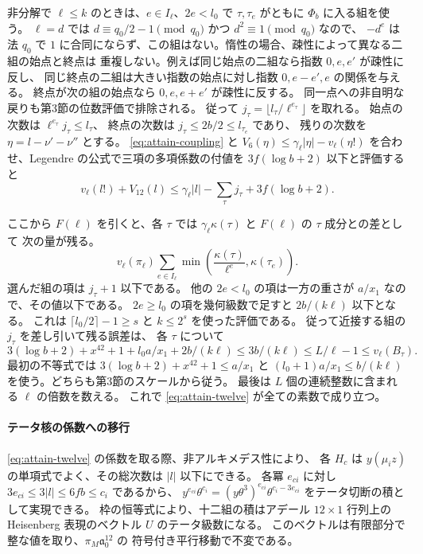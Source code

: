 非分解で \(\ell\le k\) のときは、\(e\in I_\ell\)、\(2e<l_0\) で
\(\tau,\tau_e\) がともに \(\Phi_b\) に入る組を使う。
\(\ell=d\) では \(d\equiv q_0/2-1\pmod{q_0}\) かつ \(d^2\equiv1\pmod{q_0}\) なので、
\(-d^e\) は法 \(q_0\) で \(1\) に合同にならず、この組はない。惰性の場合、疎性によって異なる二組の始点と終点は
重複しない。例えば同じ始点の二組なら指数 \(0,e,e'\) が疎性に反し、
同じ終点の二組は大きい指数の始点に対し指数 \(0,e-e',e\) の関係を与える。
終点が次の組の始点なら \(0,e,e+e'\) が疎性に反する。
同一点への非自明な戻りも第3節の位数評価で排除される。
従って \(j_\tau=\lfloor l_\tau/\ell^{e_\tau}\rfloor\) を取れる。
始点の次数は \(\ell^{e_\tau}j_\tau\le l_\tau\)、
終点の次数は \(j_\tau\le2b/2\le l_{\tau_e}\) であり、
残りの次数を \(\eta=l-\nu'-\nu''\) とする。
\eqref{eq:attain-coupling} と \(V_6(\eta)\le\gamma_\ell|\eta|-v_\ell(\eta!)\)
を合わせ、Legendre の公式で三項の多項係数の付値を
\(3f(\log b+2)\) 以下と評価すると
\[
 v_\ell(l!)+V_{12}(l)\le
   \gamma_\ell |l|-\sum_\tau j_\tau+3f(\log b+2).
\]

ここから \(F(\ell)\) を引くと、各 \(\tau\) では \(\gamma_\ell\kappa(\tau)\) と
\(F(\ell)\) の \(\tau\) 成分との差として
次の量が残る。
\[
 v_\ell(\pi_\ell)\sum_{e\in I_\ell}\min\!\left(\frac{\kappa(\tau)}{\ell^e},\kappa(\tau_e)\right) .
\]
選んだ組の項は \(j_\tau+1\) 以下である。
他の \(2e<l_0\) の項は一方の重さが \(a/x_1\) なので、その値以下である。
\(2e\ge l_0\) の項を幾何級数で足すと \(2b/(k\ell)\) 以下となる。
これは \(\lceil l_0/2\rceil-1\ge s\) と \(k\le2^s\) を使った評価である。
従って近接する組の \(j_\tau\) を差し引いて残る誤差は、
各 \(\tau\) について
\[
 3(\log b+2)+x^{42}+1+l_0 a/x_1+2b/(k\ell)
 \le 3b/(k\ell)\le L/\ell-1\le v_\ell(B_\tau).
\]
最初の不等式では
\(3(\log b+2)+x^{42}+1\le a/x_1\) と
\((l_0+1)a/x_1\le b/(k\ell)\) を使う。どちらも第3節のスケールから従う。
最後は \(L\) 個の連続整数に含まれる \(\ell\) の倍数を数える。
これで \eqref{eq:attain-twelve} が全ての素数で成り立つ。

\paragraph{テータ核の係数への移行}
\eqref{eq:attain-twelve} の係数を取る際、非アルキメデス性により、
各 \(H_c\) は \(y(\mu_i z)\) の単項式でよく、その総次数は \(|l|\) 以下にできる。
各冪 \(e_{ci}\) に対し \(3e_{ci}\le3|l|\le6fb\le c_i\) であるから、
\(y^{e_{ci}}\theta^{c_i}=(y\theta^3)^{e_{ci}}\theta^{c_i-3e_{ci}}\)
をテータ切断の積として実現できる。
枠の恒等式により、十二組の積はアデール \(12\times1\) 行列上の
Heisenberg 表現のベクトル \(U\) のテータ級数になる。
このベクトルは有限部分で整な値を取り、\(\pi_M\mathfrak a_0^{12}\) の
符号付き平行移動で不変である。

